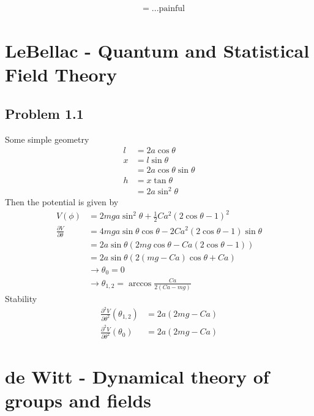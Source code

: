 \documentclass[10pt,a4paper]{book}
\theoremstyle{definition}
\begin{document}
\begin{align}
[M_{\mu\nu},M_{\rho,\sigma}]
&=...\text{painful}
\end{align}

\section{{\sc LeBellac} - Quantum and Statistical Field Theory}
\subsection{Problem 1.1}
Some simple geometry
\begin{align}
l&=2a\cos\theta\\
x&=l\sin\theta\\
&=2a\cos\theta\sin\theta\\
h&=x\tan\theta\\
&=2a\sin^2\theta
\end{align}
Then the potential is given by
\begin{align}
V(\phi)
&=2mga\sin^2\theta+\frac{1}{2}Ca^2(2\cos\theta-1)^2\\
\frac{\partial V}{\partial\theta}
&=4mga\sin\theta\cos\theta-2Ca^2(2\cos\theta-1)\sin\theta\\
&=2a\sin\theta\left(2mg\cos\theta-Ca(2\cos\theta-1)\right)\\
&=2a\sin\theta\left(2(mg-Ca)\cos\theta+Ca\right)\\
&\rightarrow\theta_0=0\\
&\rightarrow\theta_{1,2}=\arccos\frac{Ca}{2(Ca-mg)}
\end{align}
Stability
\begin{align}
\frac{\partial^2 V}{\partial\theta^2}(\theta_{1,2})
&=2a(2mg-Ca)\\
\frac{\partial^2 V}{\partial\theta^2}(\theta_{0})
&=2a(2mg-Ca)
\end{align}

\section{{\sc de Witt} - Dynamical theory of groups and fields}
\end{document}
